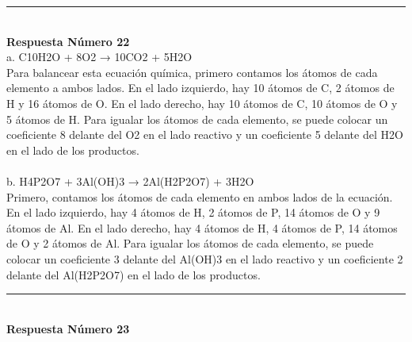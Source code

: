 \documentclass{article}
\begin{document}
\noindent\rule{\textwidth}{1pt} \\
\textbf{Respuesta Número 22} \\
a. C10H2O + 8O2 → 10CO2 + 5H2O\\
   Para balancear esta ecuación química, primero contamos los átomos de cada elemento a ambos lados. En el lado izquierdo, hay 10 átomos de C, 2 átomos de H y 16 átomos de O. En el lado derecho, hay 10 átomos de C, 10 átomos de O y 5 átomos de H. Para igualar los átomos de cada elemento, se puede colocar un coeficiente 8 delante del O2 en el lado reactivo y un coeficiente 5 delante del H2O en el lado de los productos.\\
\\
b. H4P2O7 + 3Al(OH)3 → 2Al(H2P2O7) + 3H2O\\
   Primero, contamos los átomos de cada elemento en ambos lados de la ecuación. En el lado izquierdo, hay 4 átomos de H, 2 átomos de P, 14 átomos de O y 9 átomos de Al. En el lado derecho, hay 4 átomos de H, 4 átomos de P, 14 átomos de O y 2 átomos de Al. Para igualar los átomos de cada elemento, se puede colocar un coeficiente 3 delante del Al(OH)3 en el lado reactivo y un coeficiente 2 delante del Al(H2P2O7) en el lado de los productos.\\
\noindent\rule{\textwidth}{1pt} \\
\textbf{Respuesta Número 23} \\
\end{document}
